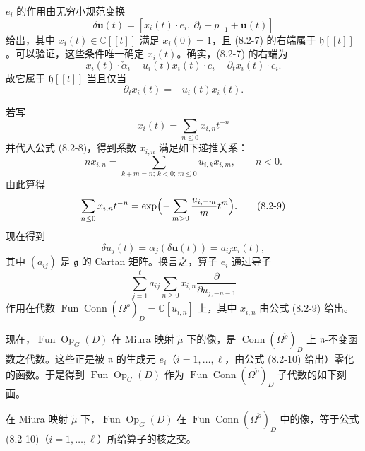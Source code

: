 $e_i$ 的作用由无穷小规范变换
\begin{equation}
    \delta\mathbf u(t)=[x_i(t)\cdot e_i,\ \partial_t+p_{-1}+\mathbf u(t)]
    \tag{8.2-7}
\end{equation}
给出，其中 $x_i(t)\in\mathbb C[\![t]\!]$ 满足 $x_i(0)=1$，且 (8.2-7) 的右端属于 $\mathfrak h[\![t]\!]$。可以验证，这些条件唯一确定 $x_i(t)$。确实，(8.2-7) 的右端为
\[
    x_i(t)\cdot\check\alpha_i-u_i(t)x_i(t)\cdot e_i-\partial_tx_i(t)\cdot e_i.
\]
故它属于 $\mathfrak h[\![t]\!]$ 当且仅当
\begin{equation}
    \partial_tx_i(t)=-u_i(t)x_i(t).
    \tag{8.2-8}
\end{equation}

若写
\[
    x_i(t)=\sum_{n\le0}x_{i,n}t^{-n}
\]
并代入公式 (8.2-8)，得到系数 $x_{i,n}$ 满足如下递推关系：
\[
    nx_{i,n}=\sum_{k+m=n;\,k<0;\,m\le0}u_{i,k}x_{i,m},\qquad n<0.
\]
由此算得
\begin{equation}
    \sum_{n\le0}x_{i,n}t^{-n}=\exp\Bigl(-\sum_{m>0}\frac{u_{i,-m}}{m}t^m\Bigr).
    \tag{8.2-9}
\end{equation}
现在得到
\[
    \delta u_j(t)=\alpha_j(\delta\mathbf u(t))=a_{ij}x_i(t),
\]
其中 $(a_{ij})$ 是 $\mathfrak g$ 的 Cartan 矩阵。换言之，算子 $e_i$ 通过导子
\begin{equation}
    \sum_{j=1}^{\ell}a_{ij}\sum_{n\ge0}x_{i,n}\frac{\partial}{\partial u_{j,-n-1}}
    \tag{8.2-10}
\end{equation}
作用在代数 $\operatorname{Fun}\operatorname{Conn}(\Omega^{\check\rho})_D=\mathbb C[u_{i,n}]$ 上，其中 $x_{i,n}$ 由公式 (8.2-9) 给出。

现在，$\operatorname{Fun}\operatorname{Op}_G(D)$ 在 Miura 映射 $\tilde\mu$ 下的像，是 $\operatorname{Conn}(\Omega^{\check\rho})_D$ 上 $\mathfrak n$-不变函数之代数。这些正是被 $\mathfrak n$ 的生成元 $e_i$（$i=1,\dots,\ell$，由公式 (8.2-10) 给出）零化的函数。于是得到 $\operatorname{Fun}\operatorname{Op}_G(D)$ 作为 $\operatorname{Fun}\operatorname{Conn}(\Omega^{\check\rho})_D$ 子代数的如下刻画。

\begin{proposition}
    在 Miura 映射 $\tilde\mu$ 下，$\operatorname{Fun}\operatorname{Op}_G(D)$ 在 $\operatorname{Fun}\operatorname{Conn}(\Omega^{\check\rho})_D$ 中的像，等于公式 (8.2-10)（$i=1,\dots,\ell$）所给算子的核之交。
\end{proposition}

